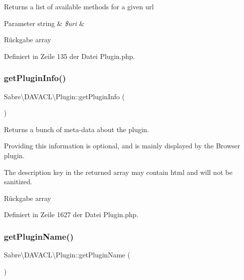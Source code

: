 Returns a list of available methods for a given url


\begin{DoxyParams}[1]{Parameter}
string & {\em \$uri} & \\
\hline
\end{DoxyParams}
\begin{DoxyReturn}{Rückgabe}
array 
\end{DoxyReturn}


Definiert in Zeile 135 der Datei Plugin.\+php.

\mbox{\label{class_sabre_1_1_d_a_v_a_c_l_1_1_plugin_a2556b6d48e26b9d1d390b5f08dfe70c7}} 
\subsubsection{\texorpdfstring{get\+Plugin\+Info()}{getPluginInfo()}}
{\footnotesize\ttfamily Sabre\textbackslash{}\+D\+A\+V\+A\+C\+L\textbackslash{}\+Plugin\+::get\+Plugin\+Info (\begin{DoxyParamCaption}{ }\end{DoxyParamCaption})}

Returns a bunch of meta-\/data about the plugin.

Providing this information is optional, and is mainly displayed by the Browser plugin.

The description key in the returned array may contain html and will not be sanitized.

\begin{DoxyReturn}{Rückgabe}
array 
\end{DoxyReturn}


Definiert in Zeile 1627 der Datei Plugin.\+php.

\mbox{\label{class_sabre_1_1_d_a_v_a_c_l_1_1_plugin_a285fd1cc7c8ac248730043dce37af3f9}} 
\subsubsection{\texorpdfstring{get\+Plugin\+Name()}{getPluginName()}}
{\footnotesize\ttfamily Sabre\textbackslash{}\+D\+A\+V\+A\+C\+L\textbackslash{}\+Plugin\+::get\+Plugin\+Name (\begin{DoxyParamCaption}{ }\end{DoxyParamCaption})}


